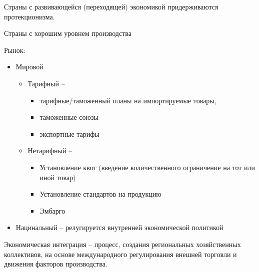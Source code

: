 \documentclass[12pt,a4paper]{book}
\begin{document}
Страны с развивающейся (переходящей) экономикой придерживаются протекционизма.

Страны с хорошим уровнем производства 

Рынок:
\begin{itemize}
	\item Мировой
	\begin{itemize}
		\item Тарифный -- 
		\begin{itemize} 
			\item тарифные/таможенный планы на импортируемые товары, 
			\item таможенные союзы
			\item экспортные тарифы
		\end{itemize}  
		\item Нетарифный --
		\begin{itemize}
			\item Установление квот (введение количественного ограничение на тот или иной товар)
			\item  Установление стандартов на продукцию
			\item Эмбарго
		\end{itemize}
	\end{itemize}
	\item Нацинальный -- релугируется внутренней экономической политикой
\end{itemize}

Экономическая интеграция -- процесс, создания региональных хозяйственных коллективов, на основе международного регулирования внешней торговли и движения факторов производства.
\end{document}
